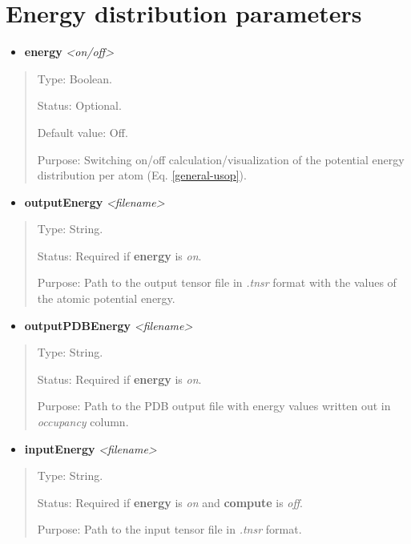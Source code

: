 \documentclass[letterpaper,10pt,english]{sphinxmanual}
\begin{document}
\section{Energy distribution parameters}
\label{general:energy-distribution-parameters}\begin{itemize}
\item {} 
\textbf{energy} \emph{\textless{}on/off\textgreater{}}

\end{itemize}
\begin{quote}

Type: Boolean.

Status: Optional.

Default value: Off.

Purpose: Switching on/off calculation/visualization of the potential energy distribution per atom (Eq. \eqref{general-usop}).
\end{quote}
\begin{itemize}
\item {} 
\textbf{outputEnergy} \emph{\textless{}filename\textgreater{}}

\end{itemize}
\begin{quote}

Type: String.

Status: Required if \textbf{energy} is \emph{on}.

Purpose:  Path to the output tensor file in \emph{.tnsr} format with the values of the atomic potential energy.
\end{quote}
\begin{itemize}
\item {} 
\textbf{outputPDBEnergy} \emph{\textless{}filename\textgreater{}}

\end{itemize}
\begin{quote}

Type: String.

Status: Required if \textbf{energy} is \emph{on}.

Purpose:  Path to the PDB output file with energy values written out in \emph{occupancy} column.
\end{quote}
\begin{itemize}
\item {} 
\textbf{inputEnergy} \emph{\textless{}filename\textgreater{}}

\end{itemize}
\begin{quote}

Type: String.

Status: Required if \textbf{energy} is \emph{on} and \textbf{compute} is \emph{off}.

Purpose:  Path to the input tensor file in \emph{.tnsr} format.
\end{quote}
\end{document}
